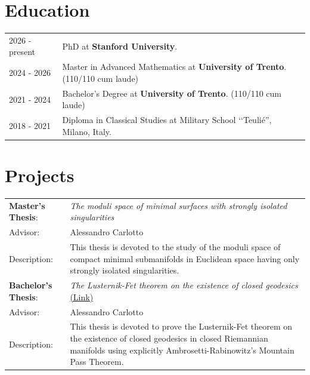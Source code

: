 \documentclass[a4paper,12pt]{article}
\begin{document}
\section{Education}
\begin{tabularx}{\linewidth}{@{}l X@{}}	
2026 - present & PhD at \textbf{Stanford University}. \\
2024 - 2026 & Master in Advanced Mathematics at \textbf{University of Trento}.  \hfill \normalsize (110/110 cum laude) \\

2021 - 2024 & Bachelor's Degree at \textbf{University of Trento}. \hfill (110/110 cum laude) \\ 

2018 - 2021 & Diploma in Classical Studies at Military School ‘‘Teulié'', Milano, Italy.
\end{tabularx}

\section{Projects}

\begin{tabularx}{\linewidth}{ @{}l X@{} }
\textbf{Master's Thesis}: &\emph{The moduli space of minimal surfaces with strongly isolated singularities} 
\\[3.75pt]
Advisor: &Alessandro Carlotto\\
Description: &This thesis is devoted to the study of the moduli space of compact minimal submanifolds in Euclidean space having only strongly isolated singularities.\\
\textbf{Bachelor's Thesis}: &\emph{The Lusternik-Fet theorem on the existence of closed geodesics}
\href{https://andreamartelli03.github.io/tesi-triennale/main.pdf}{(Link)} 
\\[3.75pt]
Advisor: & Alessandro Carlotto\\
Description: & This thesis is devoted to prove the Lusternik-Fet theorem on the existence of closed geodesics in closed Riemannian manifolds using explicitly Ambrosetti-Rabinowitz's Mountain Pass Theorem. 
\end{tabularx}


\end{document}
